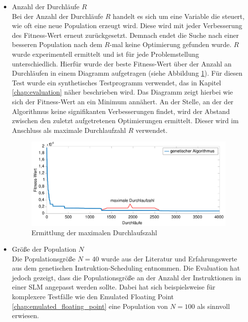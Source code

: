 \begin{itemize}
	\item Anzahl der Durchläufe $R$\\
		Bei der Anzahl der Durchläufe $R$ handelt es sich um eine Variable die steuert, wie oft eine neue Population erzeugt wird. Diese wird mit jeder Verbesserung des Fitness-Wert erneut zurückgesetzt. Demnach endet die Suche nach einer besseren Population nach dem $R$-mal keine Optimierung gefunden wurde.
		$R$ wurde experimentell ermittelt und ist für jede Problemstellung unterschiedlich. Hierfür wurde der beste Fitness-Wert über der Anzahl an Durchläufen in einem Diagramm aufgetragen (siehe Abbildung \ref{fig:iteration_analyse}). Für diesen Test wurde ein synthetisches Testprogramm verwendet, das in Kapitel \ref{chap:evaluation} näher beschrieben wird. Das Diagramm zeigt hierbei wie sich der Fitness-Wert an ein Minimum annähert. An der Stelle, an der der Algorithmus keine signifikanten Verbesserungen findet, wird der Abstand zwischen den zuletzt aufgetretenen Optimierungen ermittelt. Dieser wird im Anschluss als maximale Durchlaufzahl $R$ verwendet.
		
		\begin{figure}[H]
			\centering
			\includegraphics[width=\textwidth]{fig/iteration_analyse.pdf}
			\caption{Ermittlung der maximalen Durchlaufszahl}
			\label{fig:iteration_analyse}
		\end{figure}
	
	\item Größe der Population $N$\\
		Die Populationsgröße $N = 40$ wurde aus der Literatur \cite{grefenstette1986optimization} und Erfahrungswerte aus dem genetischen Instruktion-Scheduling entnommen. Die Evaluation hat jedoch gezeigt, dass die Populationsgröße an der Anzahl der Instruktionen in einer SLM angepasst werden sollte. Dabei hat sich beispielsweise für komplexere Testfälle wie den Emulated Floating Point \ref{chap:emulated_floating_point} eine Population von $N = 100$ als sinnvoll erwiesen.
	

\end{itemize}
